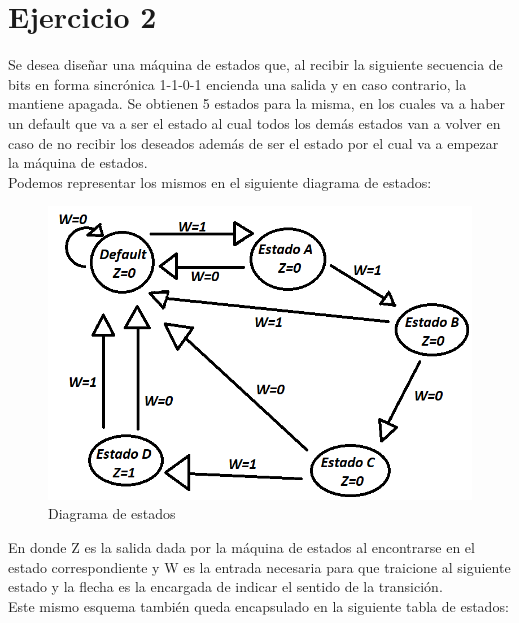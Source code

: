 \chapter{Ejercicio 2}
Se desea diseñar una máquina de estados que, al recibir la siguiente secuencia de bits en forma sincrónica 1-1-0-1 encienda una salida y en caso contrario, la mantiene apagada. Se obtienen 5 estados para la misma, en los cuales va a haber un default que va a ser el estado al cual todos los demás estados van a volver en caso de no recibir los deseados además de ser el estado por el cual va a empezar la máquina de estados.\\
Podemos representar los mismos en el siguiente diagrama de estados:\\
\begin{figure}[h!]
	\centering
	\includegraphics[scale=0.4]{../Ejercicio-2/Diagrama_de_estados.png}
	\caption{Diagrama de estados}
\end{figure}
En donde Z es la salida dada por la máquina de estados al encontrarse en el estado correspondiente y W es la entrada necesaria para que traicione al siguiente estado y la flecha es la encargada de indicar el sentido de la transición.\\
Este mismo esquema también queda encapsulado en la siguiente tabla de estados:\\
\FloatBarrier
